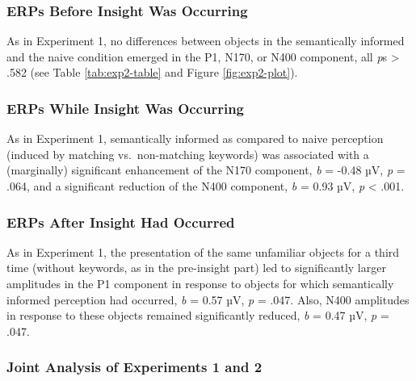 \documentclass[
  english,
  man,12pt,twoside]{apa7}
\begin{document}
\hypertarget{erps-before-insight-was-occurring-1}{%
\subsubsection{ERPs Before Insight Was Occurring}\label{erps-before-insight-was-occurring-1}}

As in Experiment 1, no differences between objects in the semantically informed and the naive condition emerged in the P1, N170, or N400 component, all \emph{p}s \textgreater{} .582 (see Table \ref{tab:exp2-table} and Figure \ref{fig:exp2-plot}).

\hypertarget{erps-while-insight-was-occurring-1}{%
\subsubsection{ERPs While Insight Was Occurring}\label{erps-while-insight-was-occurring-1}}

As in Experiment 1, semantically informed as compared to naive perception (induced by matching vs.~non-matching keywords) was associated with a (marginally) significant enhancement of the N170 component, \emph{b} = -0.48 µV, \emph{p} = .064, and a significant reduction of the N400 component, \emph{b} = 0.93 µV, \emph{p} \textless{} .001.

\hypertarget{erps-after-insight-had-occurred-1}{%
\subsubsection{ERPs After Insight Had Occurred}\label{erps-after-insight-had-occurred-1}}

As in Experiment 1, the presentation of the same unfamiliar objects for a third time (without keywords, as in the pre-insight part) led to significantly larger amplitudes in the P1 component in response to objects for which semantically informed perception had occurred, \emph{b} = 0.57 µV, \emph{p} = .047. Also, N400 amplitudes in response to these objects remained significantly reduced, \emph{b} = 0.47 µV, \emph{p} = .047.

\hypertarget{joint-analysis-of-experiments-1-and-2}{%
\subsubsection{Joint Analysis of Experiments 1 and 2}\label{joint-analysis-of-experiments-1-and-2}}
\end{document}

